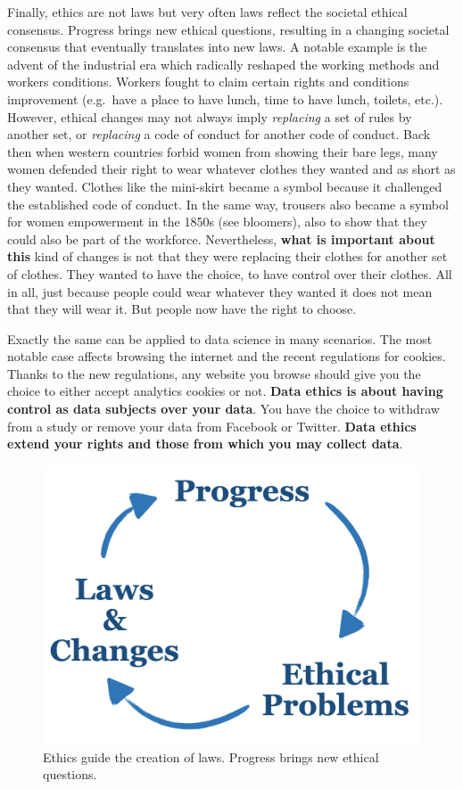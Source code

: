 \documentclass[
]{book}
\begin{document}
Finally, ethics are not laws but very often laws reflect the societal ethical consensus. Progress brings new ethical questions, resulting in a changing societal consensus that eventually translates into new laws. A notable example is the advent of the industrial era which radically reshaped the working methods and workers conditions. Workers fought to claim certain rights and conditions improvement (e.g.~have a place to have lunch, time to have lunch, toilets, etc.). However, ethical changes may not always imply \emph{replacing} a set of rules by another set, or \emph{replacing} a code of conduct for another code of conduct. Back then when western countries forbid women from showing their bare legs, many women defended their right to wear whatever clothes they wanted and as short as they wanted. Clothes like the mini-skirt became a symbol because it challenged the established code of conduct. In the same way, trousers also became a symbol for women empowerment in the 1850s (see bloomers), also to show that they could also be part of the workforce. Nevertheless, \textbf{what is important about this} kind of changes is not that they were replacing their clothes for another set of clothes. They wanted to have the choice, to have control over their clothes. All in all, just because people could wear whatever they wanted it does not mean that they will wear it. But people now have the right to choose.

Exactly the same can be applied to data science in many scenarios. The most notable case affects browsing the internet and the recent regulations for cookies. Thanks to the new regulations, any website you browse should give you the choice to either accept analytics cookies or not. \textbf{Data ethics is about having control as data subjects over your data}. You have the choice to withdraw from a study or remove your data from Facebook or Twitter. \textbf{Data ethics extend your rights and those from which you may collect data}.

\begin{figure}

{\centering \includegraphics[width=0.33\linewidth]{Figures/ethics_cycle} 

}

\caption{Ethics guide the creation of laws. Progress brings new ethical questions.}\label{fig:ethics-cycle}
\end{figure}
\end{document}
